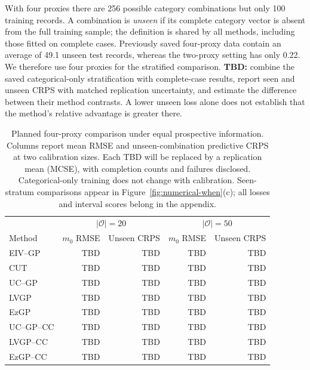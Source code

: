 With four proxies there are 256 possible category combinations but only 100 training records. A combination is \emph{unseen} if its complete category vector is absent from the full training sample; the definition is shared by all methods, including those fitted on complete cases. Previously saved four-proxy data contain an average of 49.1 unseen test records, whereas the two-proxy setting has only 0.22. We therefore use four proxies for the stratified comparison. \textbf{TBD:} combine the saved categorical-only stratification with complete-case results, report seen and unseen CRPS with matched replication uncertainty, and estimate the difference between their method contrasts. A lower unseen loss alone does not establish that the method's relative advantage is greater there.

\begin{table}[!htbp]
\centering\small
\caption{Planned four-proxy comparison under equal prospective information. Columns report mean RMSE and unseen-combination predictive CRPS at two calibration sizes. Each TBD will be replaced by a replication mean (MCSE), with completion counts and failures disclosed. Categorical-only training does not change with calibration. Seen-stratum comparisons appear in Figure~\ref{fig:numerical-when}(c); all losses and interval scores belong in the appendix.}
\label{tab:numerical-calibration-fairness}
\begin{tabular}{lrrrr}
\toprule
 & \multicolumn{2}{c}{$|\mathcal O|=20$} & \multicolumn{2}{c}{$|\mathcal O|=50$}\\
Method & $m_0$ RMSE & Unseen CRPS & $m_0$ RMSE & Unseen CRPS\\
\midrule
EIV--GP & TBD & TBD & TBD & TBD\\
CUT & TBD & TBD & TBD & TBD\\
UC--GP & TBD & TBD & TBD & TBD\\
LVGP & TBD & TBD & TBD & TBD\\
EzGP & TBD & TBD & TBD & TBD\\
UC--GP--CC & TBD & TBD & TBD & TBD\\
LVGP--CC & TBD & TBD & TBD & TBD\\
EzGP--CC & TBD & TBD & TBD & TBD\\
\bottomrule
\end{tabular}
\end{table}

